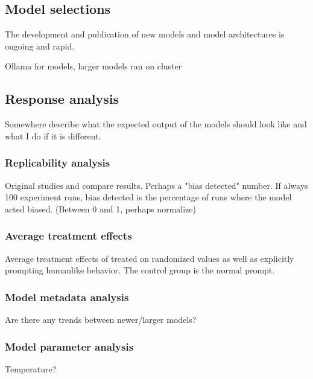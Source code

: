 \subsection{Model selections}
\par The development and publication of new models and model architectures is ongoing and rapid. 

Ollama for models, larger models ran on cluster


\subsection{Response analysis}
Somewhere describe what the expected output of the models should look like and what I do if it is different.

\subsubsection{Replicability analysis}
Original studies and compare results. Perhaps a "bias detected" number. If always 100 experiment runs, bias detected is the percentage of runs where the model acted biased. (Between 0 and 1, perhaps normalize)

\subsubsection{Average treatment effects}
Average treatment effects of treated on randomized values as well as explicitly prompting humanlike behavior. The control group is the normal prompt.

\subsubsection{Model metadata analysis}
Are there any trends between newer/larger models?

\subsubsection{Model parameter analysis}
Temperature?